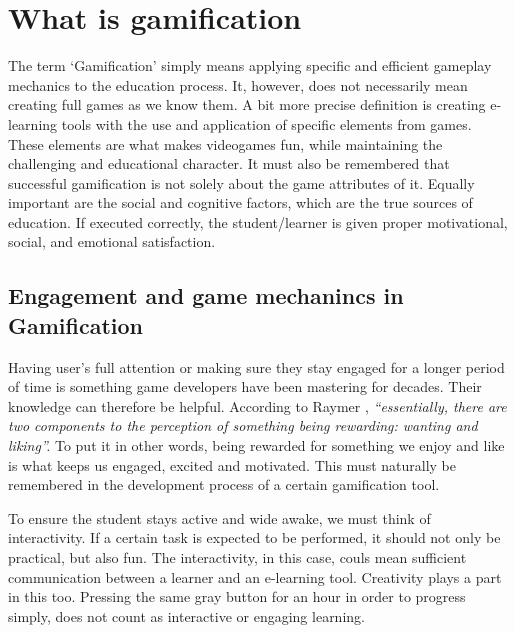 \documentclass[10pt,english,a4paper]{article}
\begin{document}
\section{What is gamification} \label{section3}
	The term ‘Gamification’ simply means applying specific and efficient gameplay mechanics to the education process. It, however, does not necessarily mean creating full games as we know them.\cite{Raymer}
	A bit more precise definition is creating e-learning tools with the use and application of specific elements from games. These elements are what makes videogames fun, while maintaining the challenging and educational character.\cite{Abu-Dawood} 
	It must also be remembered that successful gamification is not solely about the game attributes of it. Equally important are the social and cognitive factors, which are the true sources of education. \cite{Raymer}
	If executed correctly, the student/learner is given proper motivational, social, and emotional satisfaction.\cite{Abu-Dawood} 

\subsection{Engagement and game mechanincs in Gamification} \label{section3.1}
	Having user’s full attention or making sure they stay engaged for a longer period of time is something game developers have been mastering for decades. Their knowledge can therefore be helpful. 
	According to Raymer \cite{Raymer}, \textit{“essentially, there are two components to the perception of something being rewarding: wanting and liking”.} 
	To put it in other words, being rewarded for something we enjoy and like is what keeps us engaged, excited and motivated. 
	This must naturally be remembered in the development process of a certain gamification tool.

	To ensure the student stays active and wide awake, we must think of interactivity. If a certain task is expected to be performed, it should not only be practical, but also fun. 
	The interactivity, in this case, couls mean sufficient communication between a learner and an e-learning tool. Creativity plays a part in this too. Pressing the same gray button for an hour in order to progress simply, does not count as interactive or engaging learning. \cite{ AL-Smadi} 
	
\end{document}

